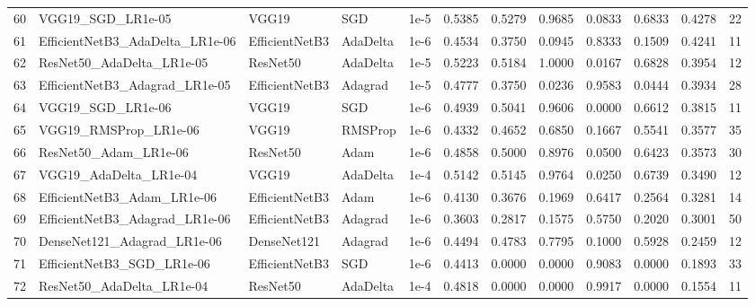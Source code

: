 \begin{longtable}{r l l l r r r r r r r r}
   60 & VGG19\_SGD\_LR1e-05       & VGG19 & SGD & 1e-5 & 0.5385 & 0.5279 & 0.9685 & 0.0833 & 0.6833 & 0.4278 & 22 \\
   61 & EfficientNetB3\_AdaDelta\_LR1e-06 & EfficientNetB3 & AdaDelta & 1e-6 & 0.4534 & 0.3750 & 0.0945 & 0.8333 & 0.1509 & 0.4241 & 11 \\
   62 & ResNet50\_AdaDelta\_LR1e-05 & ResNet50 & AdaDelta & 1e-5 & 0.5223 & 0.5184 & 1.0000 & 0.0167 & 0.6828 & 0.3954 & 12 \\
   63 & EfficientNetB3\_Adagrad\_LR1e-05 & EfficientNetB3 & Adagrad & 1e-5 & 0.4777 & 0.3750 & 0.0236 & 0.9583 & 0.0444 & 0.3934 & 28 \\
   64 & VGG19\_SGD\_LR1e-06       & VGG19 & SGD & 1e-6 & 0.4939 & 0.5041 & 0.9606 & 0.0000 & 0.6612 & 0.3815 & 11 \\
   65 & VGG19\_RMSProp\_LR1e-06   & VGG19 & RMSProp & 1e-6 & 0.4332 & 0.4652 & 0.6850 & 0.1667 & 0.5541 & 0.3577 & 35 \\
   66 & ResNet50\_Adam\_LR1e-06   & ResNet50 & Adam & 1e-6 & 0.4858 & 0.5000 & 0.8976 & 0.0500 & 0.6423 & 0.3573 & 30 \\
   67 & VGG19\_AdaDelta\_LR1e-04  & VGG19 & AdaDelta & 1e-4 & 0.5142 & 0.5145 & 0.9764 & 0.0250 & 0.6739 & 0.3490 & 12 \\
   68 & EfficientNetB3\_Adam\_LR1e-06 & EfficientNetB3 & Adam & 1e-6 & 0.4130 & 0.3676 & 0.1969 & 0.6417 & 0.2564 & 0.3281 & 14 \\
   69 & EfficientNetB3\_Adagrad\_LR1e-06 & EfficientNetB3 & Adagrad & 1e-6 & 0.3603 & 0.2817 & 0.1575 & 0.5750 & 0.2020 & 0.3001 & 50 \\
   70 & DenseNet121\_Adagrad\_LR1e-06 & DenseNet121 & Adagrad & 1e-6 & 0.4494 & 0.4783 & 0.7795 & 0.1000 & 0.5928 & 0.2459 & 12 \\
   71 & EfficientNetB3\_SGD\_LR1e-06 & EfficientNetB3 & SGD & 1e-6 & 0.4413 & 0.0000 & 0.0000 & 0.9083 & 0.0000 & 0.1893 & 33 \\
   72 & ResNet50\_AdaDelta\_LR1e-04 & ResNet50 & AdaDelta & 1e-4 & 0.4818 & 0.0000 & 0.0000 & 0.9917 & 0.0000 & 0.1554 & 11 \\
\end{longtable}
\endgroup
